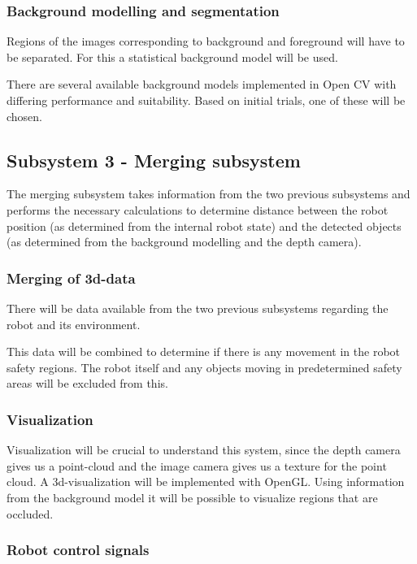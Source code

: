 \documentclass[10pt,a4paper,twocolumn,english]{article}
\begin{document}
\subsubsection{Background modelling and segmentation}

Regions of the images corresponding to background and foreground will have to be separated. For this a statistical background model will be used.

There are several available background models implemented in Open CV with differing performance and suitability. Based on initial trials, one of these will be chosen.

\subsection{Subsystem 3 - Merging subsystem}

The merging subsystem takes information from the two previous subsystems and performs the necessary calculations to determine distance between the robot position (as determined from the internal robot state) and the detected objects (as determined from the background modelling and the depth camera).

\subsubsection{Merging of 3d-data}

There will be data available from the two previous subsystems regarding the robot and its environment. 

This data will be combined to determine if there is any movement in the robot safety regions. The robot itself and any objects moving in predetermined safety areas will be excluded from this.

\subsubsection{Visualization}

Visualization will be crucial to understand this system, since the depth camera gives us a point-cloud and the image camera gives us a texture for the point cloud. A 3d-visualization will be implemented with OpenGL. Using information from the background model it will be possible to visualize regions that are occluded.

\subsubsection{Robot control signals}
\end{document}

